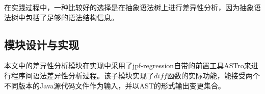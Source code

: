 在实践过程中，一种比较好的选择是在抽象语法树上进行差异性分析，因为抽象语法树中包括了足够的语法结构信息。

\subsection{模块设计与实现}

本文中的差异性分析模块在实现中采用了jpf-regression自带的前置工具ASTro来进行程序间语法差异性分析过程。该子模块实现了$diff$函数的实际功能，能接受两个不同版本的Java源代码文件作为输入，并以AST的形式输出变更集合。

%
%
%
%
%
%
%
%
%
